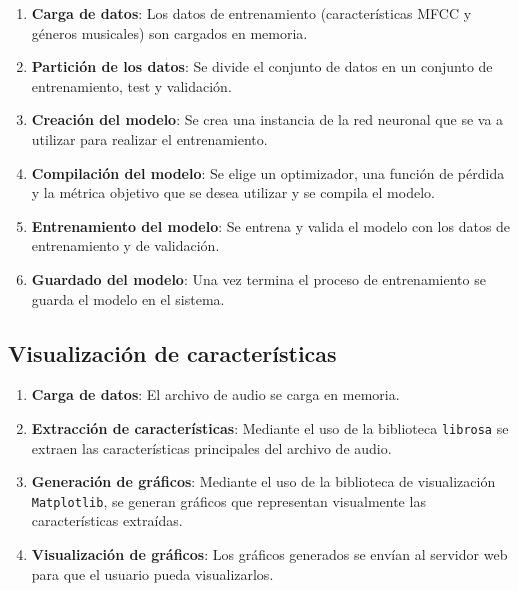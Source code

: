 \begin{enumerate}
\tightlist

\item \textbf{Carga de datos}: Los datos de entrenamiento (características MFCC y géneros musicales) son cargados en memoria.

\item \textbf{Partición de los datos}: Se divide el conjunto de datos en un conjunto de entrenamiento, test y validación.

\item \textbf{Creación del modelo}: Se crea una instancia de la red neuronal que se va a utilizar para realizar el entrenamiento.

\item \textbf{Compilación del modelo}: Se elige un optimizador, una función de pérdida y la métrica objetivo que se desea utilizar y se compila el modelo.

\item \textbf{Entrenamiento del modelo}: Se entrena y valida el modelo con los datos de entrenamiento y de validación.

\item \textbf{Guardado del modelo}: Una vez termina el proceso de entrenamiento se guarda el modelo en el sistema.

\end{enumerate}


\subsection{Visualización de características}

\begin{enumerate}
\tightlist

\item \textbf{Carga de datos}: El archivo de audio se carga en memoria.

\item \textbf{Extracción de características}: Mediante el uso de la biblioteca \texttt{librosa} se extraen las características principales del archivo de audio.

\item \textbf{Generación de gráficos}: Mediante el uso de la biblioteca de visualización \texttt{Matplotlib}, se generan gráficos que representan visualmente las características extraídas.

\item \textbf{Visualización de gráficos}: Los gráficos generados se envían al servidor web para que el usuario pueda visualizarlos.

\end{enumerate}

